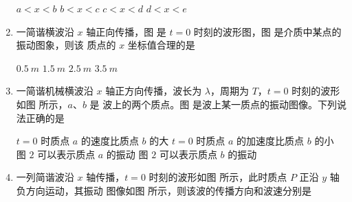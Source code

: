 \begin{enumerate}
\fourchoices
{$ a<x<b $}
{$ b<x<c $}
{$ c<x<d $}
{$ d<x<e $}


\item 
{}
一简谐横波沿 $ x $ 轴正向传播，图  是 $ t=0 $ 时刻的波形图，图  是介质中某点的振动图象，则该
质点的 $ x $ 坐标值合理的是  
\begin{figure}[h!]
	\centering
\begin{subfigure}{0.4\linewidth}
	\centering
	 
	\caption{}\label{2014安徽16a}
\end{subfigure}
\begin{subfigure}{0.4\linewidth}
	\centering
	 
	\caption{}\label{2014安徽16b}
\end{subfigure}
\end{figure}

\fourchoices
{$ 0.5 \ m $}
{$ 1.5 \ m $}
{$ 2.5 \ m $}
{$ 3.5 \ m $}


\item 
{}
一简谐机械横波沿 $ x $ 轴正方向传播，波长为 $ \lambda $，周期为 $ T $，$ t=0 $ 时刻的波形如图  所示，$ a $、$ b $ 是
波上的两个质点。图  是波上某一质点的振动图像。下列说法正确的是  
\begin{figure}[h!]
	\centering
\begin{subfigure}{0.4\linewidth}
	\centering
	 
	\caption{}\label{2014北京17a}
\end{subfigure}
\begin{subfigure}{0.4\linewidth}
	\centering
	 
	\caption{}\label{2014北京17b}
\end{subfigure}
\end{figure}

\fourchoices
{$ t=0 $ 时质点 $ a $ 的速度比质点 $ b $ 的大}
{$ t=0 $ 时质点 $ a $ 的加速度比质点 $ b $ 的小}
{图 $ 2 $ 可以表示质点 $ a $ 的振动}
{图 $ 2 $ 可以表示质点 $ b $ 的振动}

\item 
{}
一列简谐波沿 $ x $ 轴传播，$ t=0 $ 时刻的波形如图  所示，此时质点 $ P $ 正沿 $ y $ 轴负方向运动，其振动
图像如图  所示，则该波的传播方向和波速分别是  
\begin{figure}[h!]
	\centering
\begin{subfigure}{0.4\linewidth}
	\centering
	 
	\caption{}\label{2012福建13a}
\end{subfigure}
\begin{subfigure}{0.4\linewidth}
	\centering
	 
	\caption{}\label{2012福建13b}
\end{subfigure}
\end{figure}



\end{enumerate}
